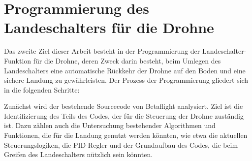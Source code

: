 \begin{comment}

\section{Analyse und Verständnis der Sensordaten}

Danach kommt die Analyse und das Verständnis der Sensordaten, die von der Drohne geliefert werden. Diese Sensordaten stammen aus verschiedenen Sensoren wie Gyroskopen und Beschleunigungsmessern die wichtige Informationen zur Flugstabilität liefern. Für diese Analyse wird die Betaflight-Applikation verwendet, die die Sensordaten in Echtzeit erfasst. \par
Die Sensordaten werden mit der Betaflight-Software erfasst, die speziell für die Konfiguration und Überwachung von Flugcontrollern in Drohnen entwickelt wurde.

Nach der Datenerfassung werden die Sensordaten in Excel (\autoref{sec:tests}) eingetragen, um die Datenverarbeitung und visuelle Analyse zu erleichtern.

Die aufbereiteten Daten werden analysiert, um Muster, Abweichungen und mögliche Instabilitäten im Flugverhalten der Drohne zu identifizieren. Dabei werden insbesondere die Schwankungen in den gemessenen Beschleunigungen und Drehgeschwindigkeiten untersucht.
Ziel ist es, ein fundiertes Verständnis der Sensordaten zu erlangen, um eine Grundlage für die Programmierung der Stabilisationsfunktion zu schaffen. Dies könnte auch die Ermittlung von Schwellenwerten oder die Identifizierung kritischer Flugzustände umfassen.
\end{comment}

\section{Programmierung des Landeschalters für die Drohne}

Das zweite Ziel dieser Arbeit besteht in der Programmierung der Landeschalter-Funktion für die Drohne, deren Zweck darin besteht, beim Umlegen des Landeschalters eine automatische Rückkehr der Drohne auf den Boden und eine sichere Landung zu gewährleisten. Der Prozess der Programmierung gliedert sich in die folgenden Schritte: 

Zunächst wird der bestehende Sourcecode von Betaflight analysiert. Ziel ist die Identifizierung des Teils des Codes, der für die Steuerung der Drohne zuständig ist. Dazu zählen auch die Untersuchung bestehender Algorithmen und Funktionen, die für die Landung genutzt werden könnten, wie etwa die aktuellen Steuerungslogiken, die PID-Regler und der Grundaufbau des Codes, die beim Greifen des Landeschalters nützlich sein könnten.

